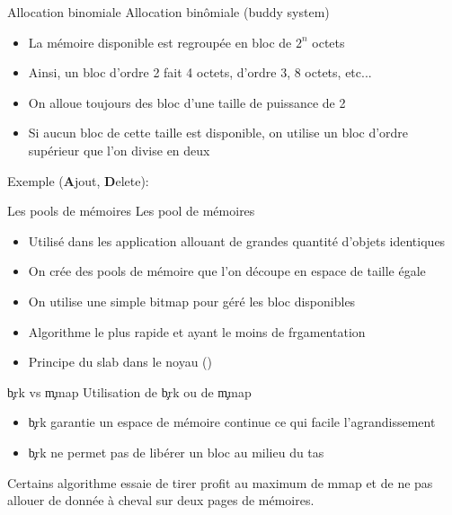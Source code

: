 \begin{frame}[fragile=singleslide]{Allocation binomiale}
  Allocation binômiale (buddy system)
  \begin{itemize}
  \item La mémoire disponible est regroupée en bloc de $2^n$ octets
  \item Ainsi, un  bloc d'ordre 2 fait 4 octets,  d'ordre 3, 8 octets,
    etc...
  \item On alloue toujours des bloc d'une taille de puissance de 2
  \item Si  aucun bloc de cette  taille est disponible,  on utilise un
    bloc d'ordre supérieur que l'on divise en deux
  \end{itemize}
  Exemple (\textbf{A}jout, \textbf{D}elete):
  \begin{center}
  \end{center}
\end{frame}

\begin{frame}[fragile=singleslide]{Les pools de mémoires}
  Les pool de mémoires
  \begin{itemize}
  \item  Utilisé dans  les  application allouant  de grandes  quantité
    d'objets identiques
  \item On  crée des pools  de mémoire que  l'on découpe en  espace de
    taille égale
  \item On utilise une simple bitmap pour géré les bloc disponibles
  \item Algorithme le plus rapide et ayant le moins de frgamentation
  \item Principe du slab dans le noyau ()
  \end{itemize}
\end{frame}

\begin{frame}[fragile=singleslide]{\c{brk} vs \c{mmap}}
  Utilisation de \c{brk} ou de \c{mmap}
  \begin{itemize}
  \item \c{brk} garantie  un espace de mémoire continue  ce qui facile
    l'agrandissement
  \item \c{brk} ne permet pas de libérer un bloc au milieu du tas
  \end{itemize}
  Certains algorithme essaie de tirer  profit au maximum de mmap et de
  ne pas allouer de donnée à cheval sur deux pages de mémoires.
\end{frame}

